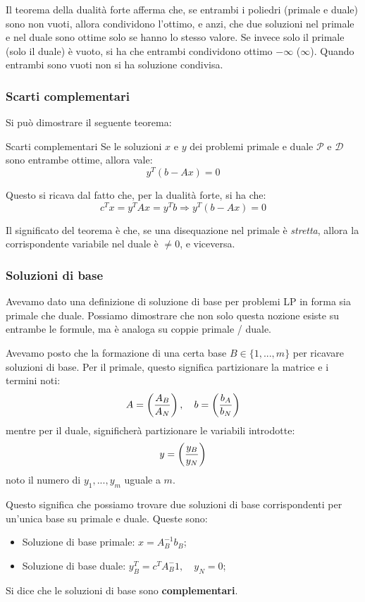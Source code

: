 \documentclass[a4paper,11pt]{article}
\begin{document}
Il teorema della dualità forte afferma che, se entrambi i poliedri (primale e duale) sono non vuoti, allora condividono l'ottimo, e anzi, che due soluzioni nel primale e nel duale sono ottime solo se hanno lo stesso valore.
Se invece solo il primale (solo il duale) è vuoto, si ha che entrambi condividono ottimo $-\infty$ ($\infty$).
Quando entrambi sono vuoti non si ha soluzione condivisa.

\subsubsection{Scarti complementari}
Si può dimostrare il seguente teorema:
\begin{theorem}{Scarti complementari}
	Se le soluzioni $x$ e $y$ dei problemi primale e duale $\mathcal{P}$ e $\mathcal{D}$ sono entrambe ottime, allora vale:
	$$ y^T (b - Ax) = 0 $$
\end{theorem}
Questo si ricava dal fatto che, per la dualità forte, si ha che:
$$
c^T x = y^T Ax = y^T b \Rightarrow y^T(b - Ax) = 0
$$

Il significato del teorema è che, se una disequazione nel primale è \textit{stretta}, allora la corrispondente variabile nel duale è $\neq 0$, e viceversa.

\subsubsection{Soluzioni di base}
Avevamo dato una definizione di soluzione di base per problemi LP in forma sia primale che duale.
Possiamo dimostrare che non solo questa nozione esiste su entrambe le formule, ma è analoga su coppie primale / duale.

Avevamo posto che la formazione di una certa base $B \in \{ 1, ..., m \}$ per ricavare soluzioni di base.
Per il primale, questo significa partizionare la matrice e i termini noti:
$$
A = \left( A_B \over A_N \right), \quad b = \left( b_A \over b_N \right)
$$
mentre per il duale, significherà partizionare le variabili introdotte:
$$
y = \left( y_B \over y_N \right)
$$
noto il numero di $y_1, ..., y_m$ uguale a $m$.

Questo significa che possiamo trovare due soluzioni di base corrispondenti per un'unica base su primale e duale.
Queste sono:
\begin{itemize}
	\item Soluzione di base primale: $ x = A_B^{-1} b_B $;
	\item Soluzione di base duale: $ y_B^T = c^T A_B^-1, \quad y_N = 0 $;
\end{itemize}
Si dice che le soluzioni di base sono \textbf{complementari}.
\end{document}
